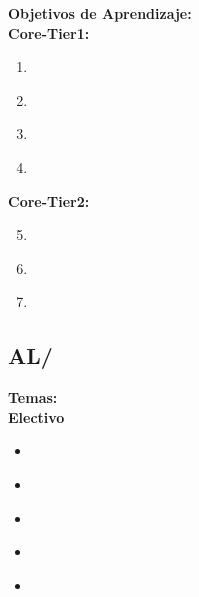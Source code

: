 \noindent \textbf{Objetivos de Aprendizaje:}\\
\noindent \textbf{Core-Tier1:}
\begin{enumerate}
	\setcounter{enumi}{0}
	\item \ALBasicAutomataComputabilityandComplexityLODiscussThe\xspace[\ALBasicAutomataComputabilityandComplexityLODiscussTheLevel]\label{sec:BOK:ALBasicAutomataComputabilityandComplexityLODiscussThe}
	\item \ALBasicAutomataComputabilityandComplexityLODesign\xspace[\ALBasicAutomataComputabilityandComplexityLODesignLevel]\label{sec:BOK:ALBasicAutomataComputabilityandComplexityLODesign}
	\item \ALBasicAutomataComputabilityandComplexityLOGenerate\xspace[\ALBasicAutomataComputabilityandComplexityLOGenerateLevel]\label{sec:BOK:ALBasicAutomataComputabilityandComplexityLOGenerate}
	\item \ALBasicAutomataComputabilityandComplexityLOExplainWhy\xspace[\ALBasicAutomataComputabilityandComplexityLOExplainWhyLevel]\label{sec:BOK:ALBasicAutomataComputabilityandComplexityLOExplainWhy}
\end{enumerate}
\noindent \textbf{Core-Tier2:}
\begin{enumerate}
	\setcounter{enumi}{4}
	\item \ALBasicAutomataComputabilityandComplexityLODesignA\xspace[\ALBasicAutomataComputabilityandComplexityLODesignALevel]\label{sec:BOK:ALBasicAutomataComputabilityandComplexityLODesignA}
	\item \ALBasicAutomataComputabilityandComplexityLODefine\xspace[\ALBasicAutomataComputabilityandComplexityLODefineLevel]\label{sec:BOK:ALBasicAutomataComputabilityandComplexityLODefine}
	\item \ALBasicAutomataComputabilityandComplexityLOExplainTheNp\xspace[\ALBasicAutomataComputabilityandComplexityLOExplainTheNpLevel]\label{sec:BOK:ALBasicAutomataComputabilityandComplexityLOExplainTheNp}
\end{enumerate}


\subsection{AL/\ALAdvancedComputationalComplexity}\label{sec:BOK:ALAdvancedComputationalComplexity}
\noindent \textbf{Temas:}\\
\noindent \textbf{Electivo}
\begin{itemize}
	\item \ALAdvancedComputationalComplexityTopicReview\label{sec:BOK:ALAdvancedComputationalComplexityTopicReview}
	\item \ALAdvancedComputationalComplexityTopicPolynomial\label{sec:BOK:ALAdvancedComputationalComplexityTopicPolynomial}
	\item \ALAdvancedComputationalComplexityTopicNp\label{sec:BOK:ALAdvancedComputationalComplexityTopicNp}
	\item \ALAdvancedComputationalComplexityTopicClassic\label{sec:BOK:ALAdvancedComputationalComplexityTopicClassic}
	\item \ALAdvancedComputationalComplexityTopicReduction\label{sec:BOK:ALAdvancedComputationalComplexityTopicReduction}
\end{itemize}


